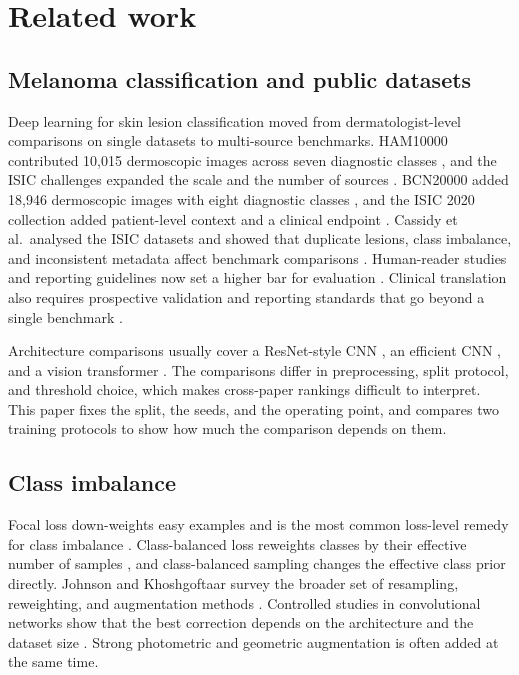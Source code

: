 \section{Related work}

\subsection{Melanoma classification and public datasets}

Deep learning for skin lesion classification moved from dermatologist-level comparisons on single datasets \citep{esteva2017dermatologist} to multi-source benchmarks. HAM10000 contributed 10,015 dermoscopic images across seven diagnostic classes \citep{tschandl2018ham10000}, and the ISIC challenges expanded the scale and the number of sources \citep{codella2018isic}. BCN20000 added 18,946 dermoscopic images with eight diagnostic classes \citep{combalia2019bcn20000}, and the ISIC 2020 collection added patient-level context and a clinical endpoint \citep{rotemberg2021isic}. Cassidy et al.\ analysed the ISIC datasets and showed that duplicate lesions, class imbalance, and inconsistent metadata affect benchmark comparisons \citep{cassidy2022isic}. Human-reader studies and reporting guidelines now set a higher bar for evaluation \citep{tschandl2019human,daneshjou2022clear}. Clinical translation also requires prospective validation and reporting standards that go beyond a single benchmark \citep{rajpurkar2022ai}.

Architecture comparisons usually cover a ResNet-style CNN \citep{he2016resnet}, an efficient CNN \citep{tan2019efficientnet}, and a vision transformer \citep{dosovitskiy2021vit}. The comparisons differ in preprocessing, split protocol, and threshold choice, which makes cross-paper rankings difficult to interpret. This paper fixes the split, the seeds, and the operating point, and compares two training protocols to show how much the comparison depends on them.

\subsection{Class imbalance}

Focal loss down-weights easy examples and is the most common loss-level remedy for class imbalance \citep{lin2017focal}. Class-balanced loss reweights classes by their effective number of samples \citep{cui2019classbalanced}, and class-balanced sampling changes the effective class prior directly. Johnson and Khoshgoftaar survey the broader set of resampling, reweighting, and augmentation methods \citep{johnson2019imbalance}. Controlled studies in convolutional networks show that the best correction depends on the architecture and the dataset size \citep{buda2018systematic}. Strong photometric and geometric augmentation is often added at the same time.

